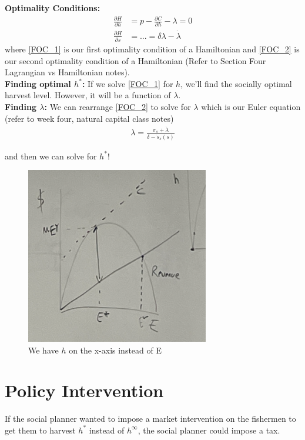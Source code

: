 \documentclass[12pt]{article}
\begin{document}
\textbf{Optimality Conditions: }
\begin{align}
    \frac{\partial H}{\partial h} &= p - \frac{\partial C}{\partial h} - \lambda = 0 \label{FOC_1} \\
    \frac{\partial H}{\partial s} &= ... = \delta \lambda - \dot \lambda \label{FOC_2}
\end{align}
where \ref{FOC_1} is our first optimality condition of a Hamiltonian and \ref{FOC_2} is our second optimality condition of a Hamiltonian (Refer to Section Four Lagrangian vs Hamiltonian notes). \\

\textbf{Finding optimal $h^*$:} If we solve \ref{FOC_1} for $h$, we'll find the socially optimal harvest level. However, it will  be a function of $\lambda$. \\

\textbf{Finding $\lambda$:} We can rearrange \ref{FOC_2} to solve for $\lambda$ which is our Euler equation (refer to week four, natural capital class notes) 
\begin{align}
    \lambda = \frac{\pi_s + \dot \lambda}{\delta - \dot s_s(s)}
\end{align}

and then we can solve for $h^*$!\\

\begin{figure}[htp]
    \centering
    \includegraphics[width=8cm]{Screen Shot 2023-03-01 at 9.38.11 AM.png}
    \caption{We have $h$ on the x-axis instead of E}
    \label{max_econ_yeild}
\end{figure}

\section{Policy Intervention}
If the social planner wanted to impose a market intervention on the fishermen to get them to harvest $h^*$ instead of $h^\infty$, the social planner could impose a tax.\\
\end{document}
